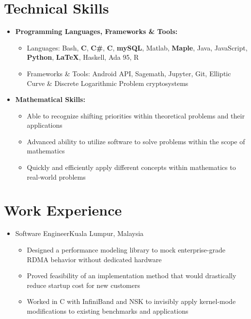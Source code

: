 \documentclass[10pt,letterpaper,sans]{moderncv}
\renewcommand{\_}{\textscale{.7}{\textunderscore}}
\newcommand{\Rplus}{\protect\hspace{-.1em}\protect\raisebox{.35ex}{\smaller{\smaller\textbf{+}}}}
\newcommand{\Cpp}{\mbox{C\Rplus\Rplus}\xspace}
\begin{document}
\section{Technical Skills}
\vspace{0.75em}
\begin{itemize}
\item \textbf{Programming Languages, Frameworks \& Tools:}
\begin{itemize}
    \item {Languages:} Bash, \textbf{C}, \textbf{C\#}, \textbf{\Cpp}, \textbf{mySQL}, Matlab, \textbf{Maple}, Java, JavaScript, \textbf{Python}, \textbf{\LaTeX}, Haskell, Ada 95, R
    \item {Frameworks \& Tools:} Android API, Sagemath, Jupyter, Git, Elliptic Curve \& Discrete Logarithmic Problem cryptosystems
\end{itemize}
\vspace{0.5em}
\item \textbf{Mathematical Skills:}
\begin{itemize}
    \item Able to recognize shifting priorities within theoretical problems and their applications
    \item Advanced ability to utilize software to solve problems within the scope of mathematics
    \item Quickly and efficiently apply different concepts within mathematics to real-world problems
\end{itemize}
\end{itemize}
\vspace{0.5em}

\section{Work Experience}
\vspace{0.75em}
\begin{itemize}
\item{
  {Software Engineer}{Kuala Lumpur, Malaysia}{}{
    \begin{itemize}
    \item Designed a performance modeling library to mock enterprise-grade RDMA behavior without dedicated hardware
    \item Proved feasibility of an implementation method that would drastically reduce startup cost for new customers
    \item Worked in C with InfiniBand and NSK to invisibly apply kernel-mode modifications to existing benchmarks and applications
    \end{itemize}
}}
\end{itemize}
\end{document}

